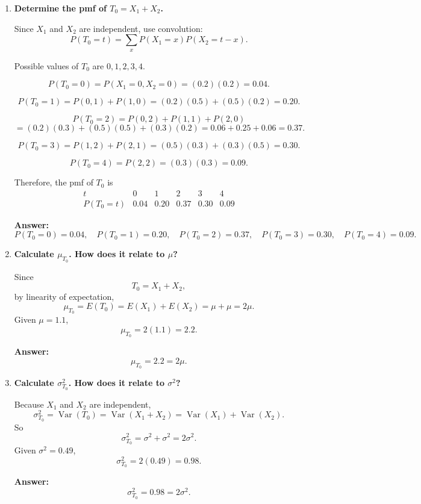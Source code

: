 \begin{enumerate}
    \item[(a)] \textbf{Determine the pmf of $T_0=X_1+X_2$.}

    Since $X_1$ and $X_2$ are independent, use convolution:
    \[
    P(T_0=t)=\sum_x P(X_1=x)P(X_2=t-x).
    \]

    Possible values of $T_0$ are $0,1,2,3,4$.

    \[
    P(T_0=0)=P(X_1=0,X_2=0)=(0.2)(0.2)=0.04.
    \]

    \[
    P(T_0=1)=P(0,1)+P(1,0)=(0.2)(0.5)+(0.5)(0.2)=0.20.
    \]

    \[
    P(T_0=2)=P(0,2)+P(1,1)+P(2,0)
    \]
    \[
    =(0.2)(0.3)+(0.5)(0.5)+(0.3)(0.2)=0.06+0.25+0.06=0.37.
    \]

    \[
    P(T_0=3)=P(1,2)+P(2,1)=(0.5)(0.3)+(0.3)(0.5)=0.30.
    \]

    \[
    P(T_0=4)=P(2,2)=(0.3)(0.3)=0.09.
    \]

    Therefore, the pmf of $T_0$ is
    \[
    \begin{array}{c|ccccc}
    t & 0 & 1 & 2 & 3 & 4\\
    \hline
    P(T_0=t) & 0.04 & 0.20 & 0.37 & 0.30 & 0.09
    \end{array}
    \]

    \textbf{Answer:}
    \[
    P(T_0=0)=0.04,\quad P(T_0=1)=0.20,\quad P(T_0=2)=0.37,\quad P(T_0=3)=0.30,\quad P(T_0=4)=0.09.
    \]

    \item[(b)] \textbf{Calculate $\mu_{T_0}$. How does it relate to $\mu$?}

    Since
    \[
    T_0=X_1+X_2,
    \]
    by linearity of expectation,
    \[
    \mu_{T_0}=E(T_0)=E(X_1)+E(X_2)=\mu+\mu=2\mu.
    \]
    Given $\mu=1.1$,
    \[
    \mu_{T_0}=2(1.1)=2.2.
    \]

    \textbf{Answer:}
    \[
    \mu_{T_0}=2.2=2\mu.
    \]

    \item[(c)] \textbf{Calculate $\sigma^2_{T_0}$. How does it relate to $\sigma^2$?}

    Because $X_1$ and $X_2$ are independent,
    \[
    \sigma^2_{T_0}=\operatorname{Var}(T_0)=\operatorname{Var}(X_1+X_2)
    =\operatorname{Var}(X_1)+\operatorname{Var}(X_2).
    \]
    So
    \[
    \sigma^2_{T_0}=\sigma^2+\sigma^2=2\sigma^2.
    \]
    Given $\sigma^2=0.49$,
    \[
    \sigma^2_{T_0}=2(0.49)=0.98.
    \]

    \textbf{Answer:}
    \[
    \sigma^2_{T_0}=0.98=2\sigma^2.
    \]
\end{enumerate}

